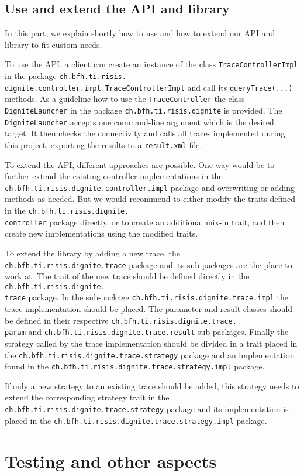 \documentclass[
	a4paper,					10pt,							twoside,					openright,				notitlepage,			parskip=half,			]{scrreprt}
\begin{document}
\section{Use and extend the \gls{API} and library}
\label{sec:api_useext}

In this part, we explain shortly how to use and how to extend our \gls{API} and library to fit custom needs.

To use the \gls{API}, a client can create an instance of the class \verb|TraceControllerImpl| in the package
\verb|ch.bfh.ti.risis.|\\\verb|dignite.controller.impl.TraceControllerImpl| and call its \verb|queryTrace(...)| methods.
As a guideline how to use the \verb|TraceController| the class \verb|DigniteLauncher| in the package 
\verb|ch.bfh.ti.risis.dignite| is provided. The \verb|DigniteLauncher| accepts one command-line argument 
which is the desired target. It then checks the connectivity and calls all traces implemented during this project, 
exporting the results to a \verb|result.xml| file.

To extend the \gls{API}, different approaches are possible. One way would be to further extend the existing
controller implementations in the \verb|ch.bfh.ti.risis.dignite.controller.impl| package and overwriting
or adding methods as needed. But we would recommend to either modify the traits defined in the 
\verb|ch.bfh.ti.risis.dignite.|\\\verb|controller| package directly, or to create an additional mix-in trait,
and then create new implementations using the modified traits.

To extend the library by adding a new trace, the \verb|ch.bfh.ti.risis.dignite.trace| package and its sub-packages
are the place to work at. The trait of the new trace should be defined directly in the \verb|ch.bfh.ti.risis.dignite.|\\\verb|trace| package.
In the sub-package \verb|ch.bfh.ti.risis.dignite.trace.impl| the trace implementation should be placed. 
The parameter and result classes should be defined in their respective \verb|ch.bfh.ti.risis.dignite.trace.|\\\verb|param| and 
\verb|ch.bfh.ti.risis.dignite.trace.result| sub-packages. 
Finally the strategy called by the trace implementation should be divided in a trait placed in the 
\verb|ch.bfh.ti.risis.dignite.trace.strategy| package
and an implementation found in the \verb|ch.bfh.ti.risis.dignite.trace.strategy.impl| package.

If only a new strategy to an existing trace should be added, this strategy needs to extend the 
corresponding strategy trait in the \verb|ch.bfh.ti.risis.dignite.trace.strategy| package and
its implementation is placed in the \verb|ch.bfh.ti.risis.dignite.trace.strategy.impl| package.\clearpage{}
\clearpage{}\chapter{Testing and other aspects} \label{chap:secperf}
\end{document}
